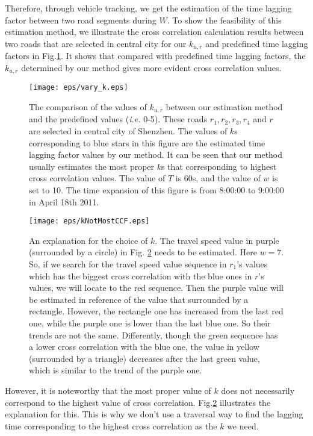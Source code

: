 \documentclass[twocolumn,10pt,final,conference]{IEEEtran}
\def\ie{\textit{i.e.}\xspace}
\begin{document}
Therefore, through vehicle tracking, we get the estimation of the time lagging factor between two road segments during $W$.
To show the feasibility of this estimation method, we illustrate the cross correlation calculation results between two roads that are selected in central city for our $k_{u,r}$ and predefined time lagging factors in Fig.\ref{fig-different time lagging factors for u and r}. It shows that compared with predefined time lagging factors, the $k_{u,r}$ determined by our method gives more evident cross correlation values.

\begin{figure}[h]
  \centering
  \texttt{[image: eps/vary\_k.eps]}
  \caption{The comparison of the values of $k_{u,r}$ between our estimation method and the predefined values (\ie 0-5). These roads $r_1, r_2, r_3, r_4$ and $r$ are selected in central city of Shenzhen.  The values of $k$s corresponding to blue stars in this figure are the estimated time lagging factor values by our method. It can be seen that our method usually estimates the most proper $k$s that corresponding to highest cross correlation values. The value of $T$ is 60s, and the value of $w$ is set to 10. The time expansion of this figure is from 8:00:00 to 9:00:00 in April 18th 2011.}
  \label{fig-different time lagging factors for u and r}
\end{figure}

\begin{figure}[h]
  \centering
  \texttt{[image: eps/kNotMostCCF.eps]}
  \caption{An explanation for the choice of $k$. The travel speed value in purple (surrounded by a circle) in Fig. \ref{fig-kNotMostCCF} needs to be estimated. Here $w=7$. So, if we search for the travel speed value sequence in $r_1$'s values which has the biggest cross correlation with the blue ones in $r$'s values, we will locate to the red sequence. Then the purple value will be estimated in reference of the value that surrounded by a rectangle. However, the rectangle one has increased from the last red one, while the purple one is lower than the last blue one. So their trends are not the same. Differently, though the green sequence has a lower cross correlation with the blue one, the value in yellow (surrounded by a triangle) decreases after the last green value, which is similar to the trend of the purple one.}
  \label{fig-kNotMostCCF}
\end{figure}

However, it is noteworthy that the most proper value of $k$  does not necessarily correspond to the highest value of cross correlation. Fig.\ref{fig-kNotMostCCF} illustrates the explanation for this. This is why we don't use a traversal way to find the lagging time corresponding to the highest cross correlation as the $k$ we need.
\end{document}
